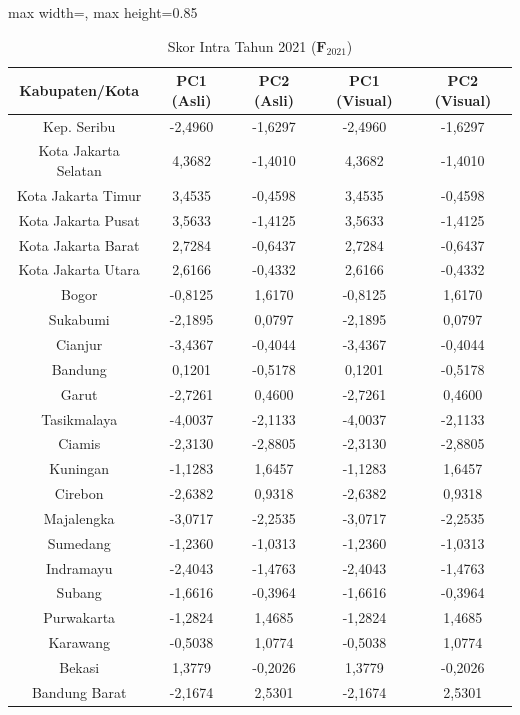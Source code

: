 \begin{table}[H]
\centering
\caption{Skor Intra Tahun 2021 ($\mathbf{F}_{2021}$)} \label{tab:app1skor_intra_2021}
\begin{adjustbox}{max width=\textwidth, max height=0.85\textheight}
\begin{tabular}{|c|c|c|c|c|}
\hline
\textbf{Kabupaten/Kota} & \textbf{PC1 (Asli)} & \textbf{PC2 (Asli)} & \textbf{PC1 (Visual)} & \textbf{PC2 (Visual)} \\
\hline
Kep. Seribu & -2,4960 & -1,6297 & -2,4960 & -1,6297 \\
Kota Jakarta Selatan & 4,3682 & -1,4010 & 4,3682 & -1,4010 \\
Kota Jakarta Timur & 3,4535 & -0,4598 & 3,4535 & -0,4598 \\
Kota Jakarta Pusat & 3,5633 & -1,4125 & 3,5633 & -1,4125 \\
Kota Jakarta Barat & 2,7284 & -0,6437 & 2,7284 & -0,6437 \\
Kota Jakarta Utara & 2,6166 & -0,4332 & 2,6166 & -0,4332 \\
Bogor & -0,8125 & 1,6170 & -0,8125 & 1,6170 \\
Sukabumi & -2,1895 & 0,0797 & -2,1895 & 0,0797 \\
Cianjur & -3,4367 & -0,4044 & -3,4367 & -0,4044 \\
Bandung & 0,1201 & -0,5178 & 0,1201 & -0,5178 \\
Garut & -2,7261 & 0,4600 & -2,7261 & 0,4600 \\
Tasikmalaya & -4,0037 & -2,1133 & -4,0037 & -2,1133 \\
Ciamis & -2,3130 & -2,8805 & -2,3130 & -2,8805 \\
Kuningan & -1,1283 & 1,6457 & -1,1283 & 1,6457 \\
Cirebon & -2,6382 & 0,9318 & -2,6382 & 0,9318 \\
Majalengka & -3,0717 & -2,2535 & -3,0717 & -2,2535 \\
Sumedang & -1,2360 & -1,0313 & -1,2360 & -1,0313 \\
Indramayu & -2,4043 & -1,4763 & -2,4043 & -1,4763 \\
Subang & -1,6616 & -0,3964 & -1,6616 & -0,3964 \\
Purwakarta & -1,2824 & 1,4685 & -1,2824 & 1,4685 \\
Karawang & -0,5038 & 1,0774 & -0,5038 & 1,0774 \\
Bekasi & 1,3779 & -0,2026 & 1,3779 & -0,2026 \\
Bandung Barat & -2,1674 & 2,5301 & -2,1674 & 2,5301 \\

\end{tabular}
\end{adjustbox}
\end{table}
